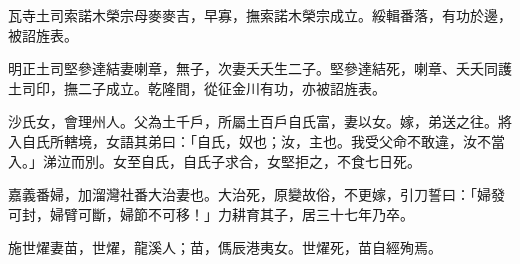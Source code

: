\begin{pinyinscope}
瓦寺土司索諾木榮宗母麥麥吉，早寡，撫索諾木榮宗成立。綏輯番落，有功於邊，被詔旌表。

明正土司堅參達結妻喇章，無子，次妻夭夭生二子。堅參達結死，喇章、夭夭同護土司印，撫二子成立。乾隆間，從征金川有功，亦被詔旌表。

沙氏女，會理州人。父為土千戶，所屬土百戶自氏富，妻以女。嫁，弟送之往。將入自氏所轄境，女語其弟曰：「自氏，奴也；汝，主也。我受父命不敢違，汝不當入。」涕泣而別。女至自氏，自氏子求合，女堅拒之，不食七日死。

嘉義番婦，加溜灣社番大治妻也。大治死，原變故俗，不更嫁，引刀誓曰：「婦發可封，婦臂可斷，婦節不可移！」力耕育其子，居三十七年乃卒。

施世燿妻苗，世燿，龍溪人；苗，傌辰港夷女。世燿死，苗自經殉焉。


\end{pinyinscope}
